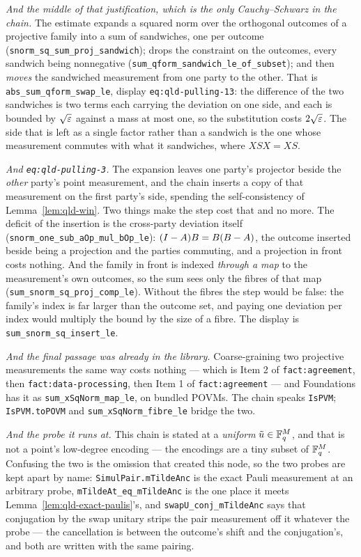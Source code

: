\emph{And the middle of that justification, which is the only Cauchy--Schwarz in the chain.}
The estimate expands a squared norm over the orthogonal outcomes of a projective family into a sum
of sandwiches, one per outcome (\texttt{snorm\_sq\_sum\_proj\_sandwich}); drops the constraint
on the outcomes, every sandwich being nonnegative
(\texttt{sum\_qform\_sandwich\_le\_of\_subset}); and then \emph{moves} the sandwiched
measurement from one party to the other. That is \texttt{abs\_sum\_qform\_swap\_le}, display
\texttt{eq:qld-pulling-13}: the difference of the two sandwiches is two terms each carrying the
deviation on one side, and each is bounded by $\sqrt{\varepsilon}$ against a mass at most one, so the
substitution costs $2\sqrt{\varepsilon}$. The side that is left as a single factor rather than a
sandwich is the one whose measurement commutes with what it sandwiches, where $XSX = XS$.

\emph{And \texttt{eq:qld-pulling-3}.} The expansion leaves one party's projector beside the
\emph{other} party's point measurement, and the chain inserts a copy of that measurement on the
first party's side, spending the self-consistency of Lemma~\ref{lem:qld-win}. Two things make the
step cost that and no more. The deficit of the insertion is the cross-party deviation itself
(\texttt{snorm\_one\_sub\_aOp\_mul\_bOp\_le}): $(I - A)B = B(B - A)$, the outcome inserted
beside being a projection and the parties commuting, and a projection in front costs nothing. And
the family in front is indexed \emph{through a map} to the measurement's own outcomes, so the sum
sees only the fibres of that map (\texttt{sum\_snorm\_sq\_proj\_comp\_le}). Without the fibres
the step would be false: the family's index is far larger than the outcome set, and paying one
deviation per index would multiply the bound by the size of a fibre. The display is
\texttt{sum\_snorm\_sq\_insert\_le}.

\emph{And the final passage was already in the library.} Coarse-graining two projective
measurements the same way costs nothing --- which is Item 2 of \texttt{fact:agreement}, then
\texttt{fact:data-processing}, then Item 1 of \texttt{fact:agreement} --- and Foundations has it
as \texttt{sum\_xSqNorm\_map\_le}, on bundled POVMs. The chain speaks \texttt{IsPVM};
\texttt{IsPVM.toPOVM} and \texttt{sum\_xSqNorm\_fibre\_le} bridge the two.

\emph{And the probe it runs at.} This chain is stated at a \emph{uniform} $\tilde{u} \in
\mathbb{F}_q^{M}$, and that is not a point's low-degree encoding --- the encodings are a tiny subset of
$\mathbb{F}_q^M$. Confusing the two is the omission that created this node, so the two probes are kept
apart by name: \texttt{SimulPair.mTildeAnc} is the exact Pauli measurement at an arbitrary probe,
\texttt{mTildeAt\_eq\_mTildeAnc} is the one place it meets
Lemma~\ref{lem:qld-exact-paulis}'s, and \texttt{swapU\_conj\_mTildeAnc} says that conjugation by
the swap unitary strips the pair measurement off it whatever the probe --- the cancellation is
between the outcome's shift and the conjugation's, and both are written with the same pairing.

